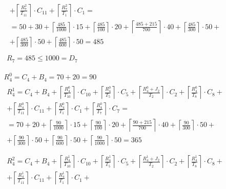 \begin{gather*}
\begin{multlined}
    + \left\lceil\frac{R_7^2}{T_{11}}\right\rceil\cdot C_{11} + %
    \left\lceil\frac{R_7^2}{T_1}\right\rceil\cdot C_1 = \\%
    = 50 + 30 + \left\lceil\frac{485}{1000}\right\rceil\cdot 15 + %
    \left\lceil\frac{485}{100}\right\rceil\cdot 20 + %
    \left\lceil\frac{485 + 215}{700}\right\rceil\cdot 40 + %
    \left\lceil\frac{485}{300}\right\rceil\cdot 50 + \\%
    + \left\lceil\frac{485}{300}\right\rceil\cdot 50 + %
    \left\lceil\frac{485}{600}\right\rceil\cdot 50 = 485 \\
  \end{multlined} \\
  R_7 = 485 \le 1000 = D_7
\end{gather*}

\begin{gather*}
  R_4^0 = C_4 + B_4 = 70 + 20 = 90 \\
  \begin{multlined}
    R_4^1 = C_4 + B_4 + \left\lceil\frac{R_4^0}{T_{10}}\right\rceil\cdot C_{10} + %
    \left\lceil\frac{R_4^0}{T_5}\right\rceil\cdot C_5 + %
    \left\lceil\frac{R_4^0 + J_2}{T_2}\right\rceil\cdot C_2 + %
    \left\lceil\frac{R_4^0}{T_8}\right\rceil\cdot C_8 + \\%
    + \left\lceil\frac{R_4^0}{T_{11}}\right\rceil\cdot C_{11} + %
    \left\lceil\frac{R_4^0}{T_1}\right\rceil\cdot C_1 +%
    \left\lceil\frac{R_4^0}{T_7}\right\rceil\cdot C_7 = \\%
    = 70 + 20 + \left\lceil\frac{90}{1000}\right\rceil\cdot 15 + %
    \left\lceil\frac{90}{100}\right\rceil\cdot 20 + %
    \left\lceil\frac{90 + 215}{700}\right\rceil\cdot 40 + %
    \left\lceil\frac{90}{300}\right\rceil\cdot 50 + \\%
    + \left\lceil\frac{90}{300}\right\rceil\cdot 50 + %
    \left\lceil\frac{90}{600}\right\rceil\cdot 50 + %
    \left\lceil\frac{90}{1000}\right\rceil\cdot 50 = 365 \\
  \end{multlined} \\
  \begin{multlined}
    R_4^2 = C_4 + B_4 + \left\lceil\frac{R_4^1}{T_{10}}\right\rceil\cdot C_{10} + %
    \left\lceil\frac{R_4^1}{T_5}\right\rceil\cdot C_5 + %
    \left\lceil\frac{R_4^1 + J_2}{T_2}\right\rceil\cdot C_2 + %
    \left\lceil\frac{R_4^1}{T_8}\right\rceil\cdot C_8 + \\%
    + \left\lceil\frac{R_4^1}{T_{11}}\right\rceil\cdot C_{11} + %
    \left\lceil\frac{R_4^1}{T_1}\right\rceil\cdot C_1 +%

\end{multlined}
\end{gather*}
